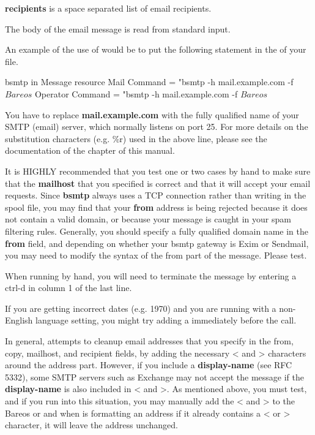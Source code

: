 {\bf recipients} is a space separated list of email recipients.

The body of the email message is read from standard input.

An example of the use of  would be to put the following statement
in the  of your  file.

\begin{bconfig}{bsmtp in Message resource}
Mail Command     = "bsmtp -h mail.example.com -f \"\(Bareos\) %
Operator Command = "bsmtp -h mail.example.com -f \"\(Bareos\) %
\end{bconfig}

You have to replace {\bf mail.example.com} with the fully
qualified name of your SMTP (email) server, which normally listens on port
25. For more details on the substitution characters (e.g. \%r) used in the
above line, please see the documentation of the
chapter of this manual.

It is HIGHLY recommended that you test one or two cases by hand to make sure
that the {\bf mailhost} that you specified is correct and that it will accept
your email requests. Since {\bf bsmtp} always uses a TCP connection rather
than writing in the spool file, you may find that your {\bf from} address is
being rejected because it does not contain a valid domain, or because your
message is caught in your spam filtering rules. Generally, you should specify
a fully qualified domain name in the {\bf from} field, and depending on
whether your bsmtp gateway is Exim or Sendmail, you may need to modify the
syntax of the from part of the message. Please test.

When running  by hand, you will need to terminate the message by
entering a ctrl-d in column 1 of the last line.

If you are getting incorrect dates (e.g. 1970) and you are
running with a non-English language setting, you might try adding
a  immediately before the  call.

In general,  attempts to cleanup email addresses that you
specify in the from, copy, mailhost, and recipient fields, by adding
the necessary {\textless} and {\textgreater} characters around the address part.  However,
if you include a {\bf display-name} (see RFC 5332), some SMTP servers
such as Exchange may not accept the message if the {\bf display-name} is
also included in {\textless} and {\textgreater}.  As mentioned above, you must test, and
if you run into this situation, you may manually add the {\textless} and {\textgreater}
to the Bareos  or  and when
 is formatting an address if it already contains a {\textless} or
{\textgreater} character, it will leave the address unchanged.

